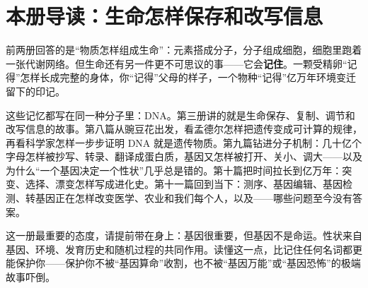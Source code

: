 \chapter*{本册导读：生命怎样保存和改写信息}

前两册回答的是“物质怎样组成生命”：元素搭成分子，分子组成细胞，细胞里跑着一张代谢网络。但生命还有另一件更不可思议的事——它会\textbf{记住}。一颗受精卵“记得”怎样长成完整的身体，你“记得”父母的样子，一个物种“记得”亿万年环境变迁留下的印记。

这些记忆都写在同一种分子里：DNA。第三册讲的就是生命保存、复制、调节和改写信息的故事。第八篇从豌豆花出发，看孟德尔怎样把遗传变成可计算的规律，再看科学家怎样一步步证明 DNA 就是遗传物质。第九篇钻进分子机制：几十亿个字母怎样被抄写、转录、翻译成蛋白质，基因又怎样被打开、关小、调大——以及为什么“一个基因决定一个性状”几乎总是错的。第十篇把时间拉长到亿万年：突变、选择、漂变怎样写成进化史。第十一篇回到当下：测序、基因编辑、基因检测、转基因正在怎样改变医学、农业和我们每个人，以及——哪些问题至今没有答案。

这一册最重要的态度，请提前带在身上：基因很重要，但基因不是命运。性状来自基因、环境、发育历史和随机过程的共同作用。读懂这一点，比记住任何名词都更能保护你——保护你不被“基因算命”收割，也不被“基因万能”或“基因恐怖”的极端故事吓倒。
